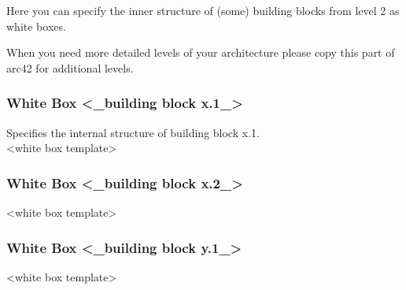 Here you can specify the inner structure of (some) building blocks from level 2 as white boxes.

When you need more detailed levels of your architecture please copy this part of arc42 for additional levels.

\subsubsection{White Box \textless\_building block x.1\_\textgreater}
Specifies the internal structure of building block x.1.\\
\textless white box template\textgreater

\subsubsection{White Box \textless\_building block x.2\_\textgreater}
\textless white box template\textgreater

\subsubsection{White Box \textless\_building block y.1\_\textgreater}
\textless white box template\textgreater

